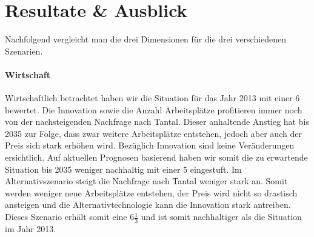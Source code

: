 \section{Resultate \& Ausblick}\label{sec:conflict}

Nachfolgend vergleicht man die drei Dimensionen für die drei verschiedenen Szenarien.

\paragraph{Wirtschaft}
Wirtschaftlich betrachtet haben wir die Situation für das Jahr 2013 mit einer 6
bewertet. Die Innovation sowie die Anzahl Arbeitsplätze profitieren immer noch von
der nachsteigenden Nachfrage nach Tantal. Dieser anhaltende Anstieg hat bis 2035 zur Folge,
dass zwar weitere Arbeitsplätze entstehen, jedoch aber auch der Preis sich stark erhöhen
wird. Bezüglich Innovation sind keine Veränderungen ersichtlich. Auf aktuellen Prognosen
basierend haben wir somit die zu erwartende Situation bis 2035 weniger nachhaltig mit einer 5 eingestuft.
Im Alternativszenario steigt die Nachfrage nach Tantal weniger stark an. Somit werden
weniger neue Arbeitsplätze entstehen, der Preis wird nicht so drastisch ansteigen
und die Alternativtechnologie kann die Innovation stark antreiben. Dieses Szenario
erhält somit eine 6\(\frac{1}{3}\) und ist somit nachhaltiger als die Situation
im Jahr 2013.

